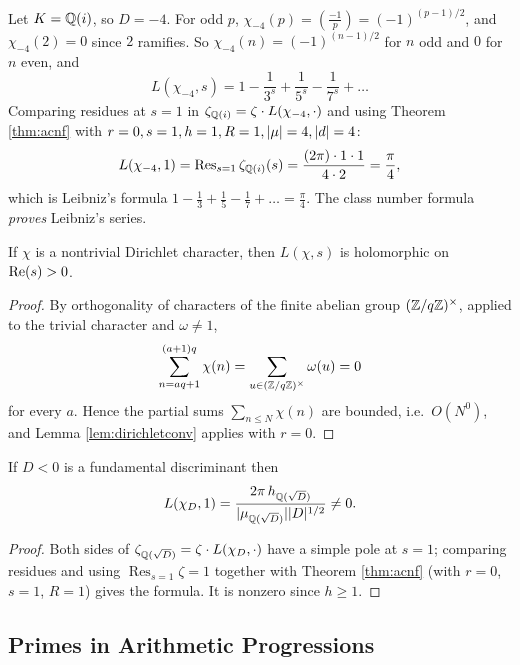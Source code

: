 \documentclass[a4paper]{scrartcl}
\newcommand{\Res}{\operatorname{Res}}
\newcommand{\legendre}[2]{\left( \frac{#1}{#2} \right)}
\begin{document}
\begin{example}
	Let $K = \mathbb{Q}(i)$, so $D = -4$. For odd $p$, $\chi_{-4}(p) = \legendre{-1}{p} = (-1)^{(p-1)/2}$, and $\chi_{-4}(2) = 0$ since $2$ ramifies. So $\chi_{-4}(n) = (-1)^{(n-1)/2}$ for $n$ odd and $0$ for $n$ even, and
	$$L(\chi_{-4},s) = 1-\frac1{3^s}+\frac1{5^s}-\frac1{7^s}+\dots$$
	Comparing residues at $s = 1$ in $\zeta_{\mathbb{Q}(i)} = \zeta\cdot L(\chi_{-4},\cdot)$ and using Theorem \ref{thm:acnf} with $r=0,s=1,h=1,R=1,\lvert\mu\rvert = 4,\lvert d\rvert = 4$:
	$$L(\chi_{-4},1) = \Res_{s=1}\zeta_{\Q(i)}(s) = \frac{(2\pi)\cdot 1\cdot 1}{4\cdot 2} = \frac\pi4,$$
	which is Leibniz's formula $1-\tfrac13+\tfrac15-\tfrac17+\dots = \tfrac\pi4$. The class number formula \emph{proves} Leibniz's series.
\end{example}

\begin{lemma}\label{lem:Lnontrivial}
	If $\chi$ is a nontrivial Dirichlet character, then $L(\chi,s)$ is holomorphic on $\operatorname{Re}(s)>0$.
\end{lemma}

\begin{proof}
	By orthogonality of characters of the finite abelian group $(\mathbb{Z}/q\mathbb{Z})^\times$, applied to the trivial character and $\omega \neq 1$,
	$$\sum_{n = aq+1}^{(a+1)q}\chi(n) = \sum_{u \in (\mathbb{Z}/q\mathbb{Z})^\times}\omega(u) = 0$$
	for every $a$. Hence the partial sums $\sum_{n\le N}\chi(n)$ are bounded, i.e.\ $O(N^0)$, and Lemma \ref{lem:dirichletconv} applies with $r = 0$.
\end{proof}

\begin{corollary}
	If $D < 0$ is a fundamental discriminant then
	$$L(\chi_D,1) = \frac{2\pi\, h_{\mathbb{Q}(\sqrt D)}}{\lvert\mu_{\mathbb{Q}(\sqrt D)}\rvert\lvert D\rvert^{1/2}} \neq 0.$$
\end{corollary}

\begin{proof}
	Both sides of $\zeta_{\mathbb{Q}(\sqrt D)} = \zeta\cdot L(\chi_D,\cdot)$ have a simple pole at $s=1$; comparing residues and using $\Res_{s=1}\zeta = 1$ together with Theorem \ref{thm:acnf} (with $r=0$, $s=1$, $R = 1$) gives the formula. It is nonzero since $h \geq 1$.
\end{proof}

\subsection{Primes in Arithmetic Progressions}
\end{document}
